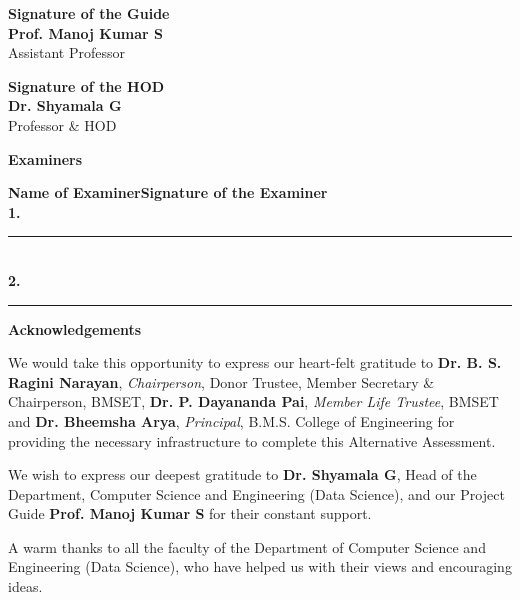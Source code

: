 \documentclass[12pt,a4paper]{article}
\newcommand{\GuideName}{Prof. Manoj Kumar S}
\newcommand{\GuideDesignation}{Assistant Professor}
\numberwithin{equation}{section}
\numberwithin{table}{section}
\numberwithin{figure}{section}
\begin{document}
\vspace{0.3cm}
\noindent\begin{minipage}[t]{0.5\textwidth}
\textbf{Signature of the Guide}\\[0.25cm]
\textbf{\GuideName}\\
\GuideDesignation
\end{minipage}%
\begin{minipage}[t]{0.5\textwidth}
\raggedleft
\textbf{Signature of the HOD}\\[0.25cm]
\textbf{Dr. Shyamala G}\\
Professor \& HOD
\end{minipage}

\vspace{0.3cm}
\begin{center}\textbf{Examiners}\end{center}
\noindent\textbf{Name of Examiner}\hfill\textbf{Signature of the Examiner}\\[0.4cm]
\textbf{1.}\hfill\rule{4.5cm}{0.4pt}\\[0.4cm]
\textbf{2.}\hfill\rule{4.5cm}{0.4pt}
\endgroup

\newpage
\begin{center}{\large\bfseries Acknowledgements}\end{center}

We would take this opportunity to express our heart-felt gratitude to \textbf{Dr. B. S. Ragini Narayan}, \textit{Chairperson}, Donor Trustee, Member Secretary \& Chairperson, BMSET, \textbf{Dr. P. Dayananda Pai}, \textit{Member Life Trustee}, BMSET and \textbf{Dr. Bheemsha Arya}, \textit{Principal}, B.M.S. College of Engineering for providing the necessary infrastructure to complete this Alternative Assessment.

We wish to express our deepest gratitude to \textbf{Dr. Shyamala G}, Head of the Department, Computer Science and Engineering (Data Science), and our Project Guide \textbf{\GuideName} for their constant support.

A warm thanks to all the faculty of the Department of Computer Science and Engineering (Data Science), who have helped us with their views and encouraging ideas.

\newpage
\tableofcontents
\newpage
\listoffigures
{}
\listoftables
{}
\newpage
\end{document}

